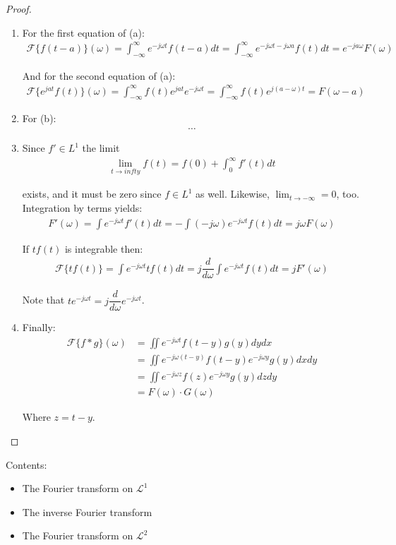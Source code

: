 \begin{proof}
\begin{enumerate}[label=(\alph*)]
\item
For the first equation of (a):
\begin{align*}
\mathcal{F}\{f(t-a)\}(\omega) = \int_{-\infty}^\infty e^{-j\omega t} f(t - a) dt = \int_{-\infty}^\infty e^{-j\omega t - j\omega a} f(t) dt = e^{-ja \omega} F(\omega)
\end{align*}

And for the second equation of (a):
\begin{align*}
\mathcal{F}\{e^{jat} f(t)\}(\omega) = \int_{-\infty}^\infty f(t) e^{jat} e^{-j \omega t} = \int_{-\infty}^\infty f(t) e^{j(a- \omega)t} = F(\omega - a)
\end{align*}

\item For (b):
\begin{align*}
\dots
\end{align*}

\item Since $f' \in L^1$ the limit
\begin{align*}
\lim_{t \to infty} f(t) = f(0) + \int_0^\infty f'(t) dt
\end{align*}

exists, and it must be zero since $f \in L^1$ as well. Likewise, $\lim_{t \to -\infty} = 0$, too. Integration by terms yields:
\begin{align*}
F'(\omega) = \int e^{-j \omega t} f'(t) dt = - \int (-j \omega) e^{-j \omega t} f(t) dt = j\omega F(\omega)
\end{align*}

If $tf(t)$ is integrable then:
\begin{align*}
\mathcal{F}\{tf(t)\} = \int e^{-j \omega t} t f(t) dt = j \dfrac{d}{d\omega} \int e^{-j \omega t} f(t) dt = j F'(\omega)
\end{align*}

Note that $t e^{-j \omega t} = j \dfrac{d}{d\omega} e^{-j\omega t}$.

\item Finally:
\begin{align*}
\mathcal{F}\{f*g\}(\omega) &= \iint e^{-j \omega t} f(t - y) g(y) dy dx \\
&= \iint e^{-j\omega(t-y)} f(t-y) e^{-j\omega y} g(y) dx dy \\
&= \iint e^{-j\omega z} f(z) e^{-j\omega y} g(y) dz dy \\
&= F(\omega) \cdot G(\omega)
\end{align*}

Where $z = t - y$.
\end{enumerate}
\end{proof}

Contents:
\begin{itemize}
\item The Fourier transform on $\mathcal{L}^1$
\item The inverse Fourier transform
\item The Fourier transform on $\mathcal{L}^2$
\end{itemize}